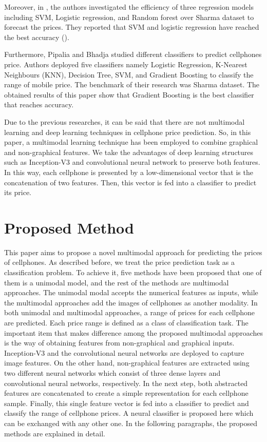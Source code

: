 \documentclass{svjour3}                     \smartqed  \usepackage{graphicx}
\begin{document}
Moreover, in \cite{Subhiksha2020}, the authors investigated the efficiency of three regression models including SVM, Logistic regression, and Random forest over Sharma dataset to forecast the prices.  They reported that SVM and logistic regression have reached the best accuracy (). 

Furthermore, Pipalia and Bhadja \cite{Pipalia2020} studied different classifiers to predict cellphones price. Authors deployed five classifiers namely Logistic Regression, K-Nearest Neighbours (KNN), Decision Tree, SVM, and Gradient Boosting to classify the range of mobile price. The benchmark of their research was Sharma dataset. The obtained results of this paper show that Gradient Boosting is the best classifier that reaches  accuracy. 

Due to the previous researches, it can be said that there are not multimodal learning and deep learning techniques in cellphone price prediction. So, in this paper, a multimodal learning technique has been employed to combine graphical and non-graphical features. We take the advantages of deep learning structures such as Inception-V3 and convolutional neural network to preserve both features. In this way, each cellphone is presented by a low-dimensional vector that is the concatenation of two features. Then, this vector is fed into a classifier to predict its price. 
\section{Proposed Method} \label{Sec:Method}
This paper aims to propose a novel multimodal approach for predicting the prices of cellphones. As described before, we treat the price prediction task as a classification problem. To achieve it, five methods have been proposed that one of them is a unimodal model, and the rest of the methods are multimodal approaches. The unimodal modal accepts the numerical features as inputs, while the multimodal approaches add the images of cellphones as another modality.  In both unimodal and multimodal approaches, a range of prices for each cellphone are predicted. Each price range is defined as a class of classification task. The important item that makes difference among the proposed multimodal approaches is the way of obtaining features from non-graphical and graphical inputs. Inception-V3 and the convolutional neural networks are deployed to capture image features. On the other hand, non-graphical features are extracted using two different neural networks which consist of three dense layers and convolutional neural networks, respectively. In the next step, both abstracted features are concatenated to create a simple representation for each cellphone sample. Finally, this single feature vector is fed into a classifier to predict and classify the range of cellphone prices. A neural classifier is proposed here which can be exchanged with any other one. In the following paragraphs, the proposed methods are explained in detail. 
\end{document}
